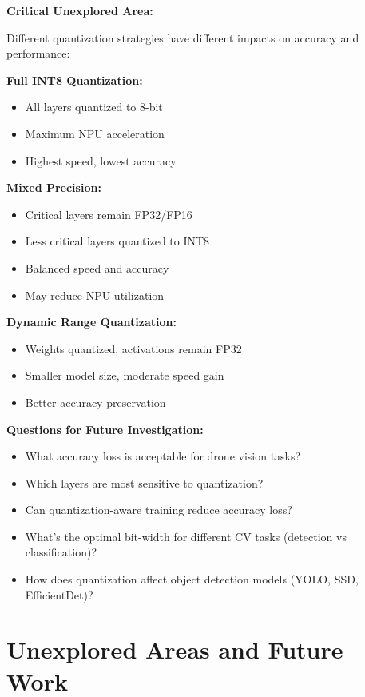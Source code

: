 \documentclass[12pt,a4paper]{report}
\begin{document}
\begin{important}
\textbf{Critical Unexplored Area:}

Different quantization strategies have different impacts on accuracy and performance:

\textbf{Full INT8 Quantization:}
\begin{itemize}
    \item All layers quantized to 8-bit
    \item Maximum NPU acceleration
    \item Highest speed, lowest accuracy
\end{itemize}

\textbf{Mixed Precision:}
\begin{itemize}
    \item Critical layers remain FP32/FP16
    \item Less critical layers quantized to INT8
    \item Balanced speed and accuracy
    \item May reduce NPU utilization
\end{itemize}

\textbf{Dynamic Range Quantization:}
\begin{itemize}
    \item Weights quantized, activations remain FP32
    \item Smaller model size, moderate speed gain
    \item Better accuracy preservation
\end{itemize}

\textbf{Questions for Future Investigation:}
\begin{itemize}
    \item What accuracy loss is acceptable for drone vision tasks?
    \item Which layers are most sensitive to quantization?
    \item Can quantization-aware training reduce accuracy loss?
    \item What's the optimal bit-width for different CV tasks (detection vs classification)?
    \item How does quantization affect object detection models (YOLO, SSD, EfficientDet)?
\end{itemize}
\end{important}

\section{Unexplored Areas and Future Work}
\end{document}
